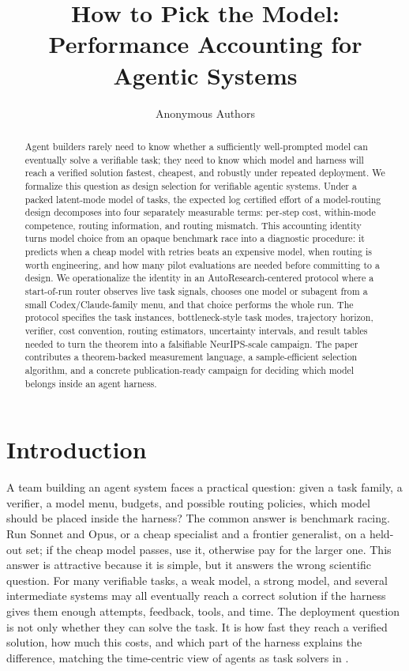 \documentclass{article}
\title{How to Pick the Model:\\
Performance Accounting for Agentic Systems}
\author{Anonymous Authors}
\newcounter{algorithm}
\begin{document}
\maketitle

\begin{abstract}
Agent builders rarely need to know whether a sufficiently well-prompted model can eventually solve a verifiable task; they need to know which model and harness will reach a verified solution fastest, cheapest, and robustly under repeated deployment.
We formalize this question as design selection for verifiable agentic systems.
Under a packed latent-mode model of tasks, the expected log certified effort of a model-routing design decomposes into four separately measurable terms: per-step cost, within-mode competence, routing information, and routing mismatch.
This accounting identity turns model choice from an opaque benchmark race into a diagnostic procedure: it predicts when a cheap model with retries beats an expensive model, when routing is worth engineering, and how many pilot evaluations are needed before committing to a design.
We operationalize the identity in an AutoResearch-centered protocol where a start-of-run router observes live task signals, chooses one model or subagent from a small Codex/Claude-family menu, and that choice performs the whole run.
The protocol specifies the task instances, bottleneck-style task modes, trajectory horizon, verifier, cost convention, routing estimators, uncertainty intervals, and result tables needed to turn the theorem into a falsifiable NeurIPS-scale campaign.
The paper contributes a theorem-backed measurement language, a sample-efficient selection algorithm, and a concrete publication-ready campaign for deciding which model belongs inside an agent harness.
\end{abstract}

\section{Introduction}
\label{sec:intro}

A team building an agent system faces a practical question: given a task family, a verifier, a model menu, budgets, and possible routing policies, which model should be placed inside the harness?
The common answer is benchmark racing.
Run Sonnet and Opus, or a cheap specialist and a frontier generalist, on a held-out set; if the cheap model passes, use it, otherwise pay for the larger one.
This answer is attractive because it is simple, but it answers the wrong scientific question.
For many verifiable tasks, a weak model, a strong model, and several intermediate systems may all eventually reach a correct solution if the harness gives them enough attempts, feedback, tools, and time.
The deployment question is not only whether they can solve the task.
It is how fast they reach a verified solution, how much this costs, and which part of the harness explains the difference, matching the time-centric view of agents as task solvers in \citet{achille2025agents}.
\end{document}
